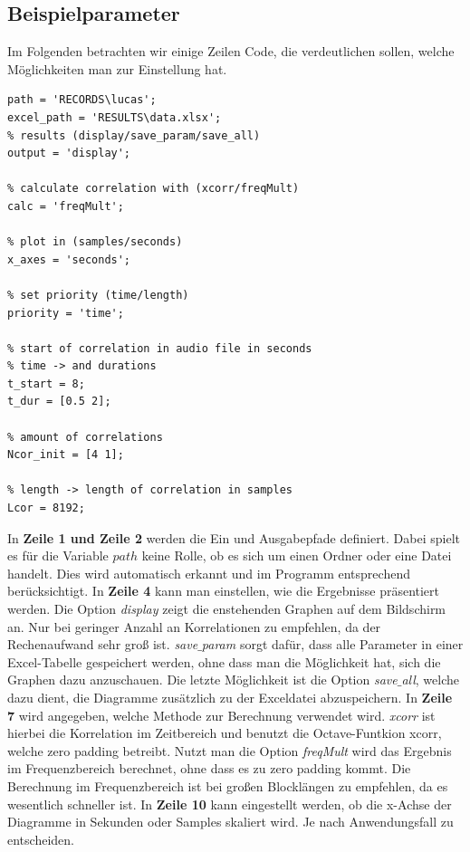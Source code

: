 \subsection{Beispielparameter}
Im Folgenden betrachten wir einige Zeilen Code, die verdeutlichen sollen, welche Möglichkeiten man zur Einstellung hat.
\begin{lstlisting}
path = 'RECORDS\lucas';
excel_path = 'RESULTS\data.xlsx';
% results (display/save_param/save_all)
output = 'display';

% calculate correlation with (xcorr/freqMult)
calc = 'freqMult';

% plot in (samples/seconds)
x_axes = 'seconds';

% set priority (time/length)
priority = 'time';

% start of correlation in audio file in seconds
% time -> and durations 
t_start = 8;
t_dur = [0.5 2];

% amount of correlations 
Ncor_init = [4 1];

% length -> length of correlation in samples
Lcor = 8192; 
\end{lstlisting}
In \textbf{Zeile 1 und Zeile 2} werden die Ein und Ausgabepfade definiert. Dabei spielt es für die Variable $path$ keine Rolle, ob es sich um einen Ordner oder eine Datei handelt. Dies wird automatisch erkannt und im Programm entsprechend berücksichtigt.\newline
In \textbf{Zeile 4} kann man einstellen, wie die Ergebnisse präsentiert werden. Die Option \textit{display} zeigt die enstehenden Graphen auf dem Bildschirm an. Nur bei geringer Anzahl an Korrelationen zu empfehlen, da der Rechenaufwand sehr groß ist. \textit{save$\_$param} sorgt dafür, dass alle Parameter in einer Excel-Tabelle gespeichert werden, ohne dass man die Möglichkeit hat, sich die Graphen dazu anzuschauen. Die letzte Möglichkeit ist die Option \textit{save$\_$all}, welche dazu dient, die Diagramme zusätzlich zu der Exceldatei abzuspeichern.\newline
In \textbf{Zeile 7} wird angegeben, welche Methode zur Berechnung verwendet wird. \textit{xcorr} ist hierbei die Korrelation im Zeitbereich und benutzt die Octave-Funtkion xcorr, welche zero padding betreibt. Nutzt man die Option \textit{freqMult} wird das Ergebnis im Frequenzbereich berechnet, ohne dass es zu zero padding kommt. Die Berechnung im Frequenzbereich ist bei großen Blocklängen zu empfehlen, da es wesentlich schneller ist.\newline
In \textbf{Zeile 10} kann eingestellt werden, ob die x-Achse der Diagramme in Sekunden oder Samples skaliert wird. Je nach Anwendungsfall zu entscheiden.\newline
